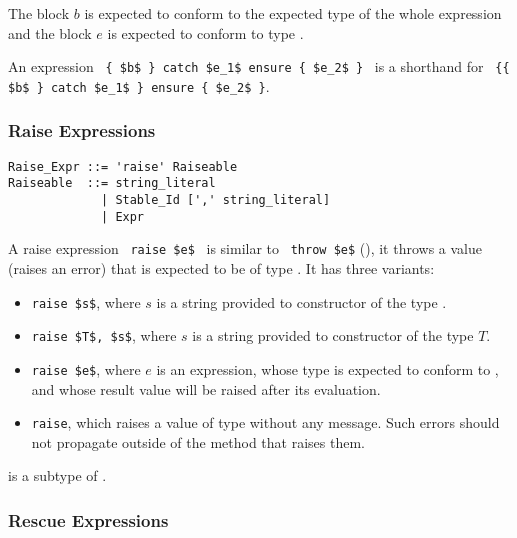 The block $b$ is expected to conform to the expected type of the whole expression and the  block $e$ is expected to conform to type . 

An expression ~\lstinline!{ $b$ } catch $e_1$ ensure { $e_2$ }!~ is a shorthand for ~\lstinline!{{ $b$ } catch $e_1$ } ensure { $e_2$ }!. 





\subsubsection{Raise Expressions}

\syntax\begin{lstlisting}
Raise_Expr ::= 'raise' Raiseable
Raiseable  ::= string_literal
             | Stable_Id [',' string_literal]
             | Expr
\end{lstlisting}

A raise expression ~\lstinline!raise $e$!~ is similar to ~\lstinline!throw $e$! (), it throws a value (raises an error) that is expected to be of type . It has three variants: 
\begin{itemize}
\item[] \lstinline!raise $s$!, where $s$ is a string provided to constructor of the type . 
\item[] \lstinline!raise $T$, $s$!, where $s$ is a string provided to constructor of the type $T$. 
\item[] \lstinline!raise $e$!, where $e$ is an expression, whose type is expected to conform to , and whose result value will be raised after its evaluation. 
\item[] \lstinline!raise!, which raises a value of type  without any message. Such errors should not propagate outside of the method that raises them. 
\end{itemize}

 is a subtype of . 







\subsubsection{Rescue Expressions}


